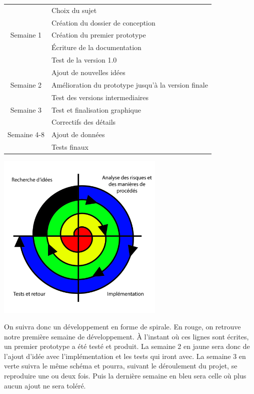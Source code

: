 \documentclass{article}
\begin{document}
\begin{tabular*}{1.0\textwidth}{@{\extracolsep{\fill}} | c | l | }
  \hline
  & Choix du sujet\\
  & Cr\'eation du dossier de conception\\
  Semaine 1 & Cr\'eation du premier prototype\\
  & \'Ecriture de la documentation\\
  & Test de la version 1.0\hspace*{7.6cm}\\
  \hline
  & Ajout de nouvelles id\'ees\\ 
  Semaine 2  & Am\'elioration du prototype jusqu'\`a la version finale\\
  & Test des versions intermediaires\\
  \hline
  Semaine 3  & Test et finalisation graphique\\
  \hline
  & Correctifs des d\'etails\\
  Semaine 4-8 & Ajout de donn\'ees\\
  & Tests finaux\\
  \hline
\end{tabular*}

\begin{center}
\includegraphics[width=0.6\textwidth]{spiral}\\
\end{center}

\hspace*{0.6cm}On suivra donc un d\'eveloppement en forme de spirale. En rouge, on retrouve notre premi\`ere semaine de d\'eveloppement. \`A l'instant o\`u ces lignes sont \'ecrites, un premier prototype a \'et\'e test\'e et produit. La semaine 2 en jaune sera donc de l'ajout d'id\'ee avec l'impl\'ementation et les tests qui iront avec. La semaine 3 en verte suivra le m\^eme sch\'ema et pourra, suivant le d\'eroulement du projet, se reproduire une ou deux fois. Puis la derni\`ere semaine en bleu sera celle o\`u plus aucun ajout ne sera tol\'er\'e.
\end{document}
